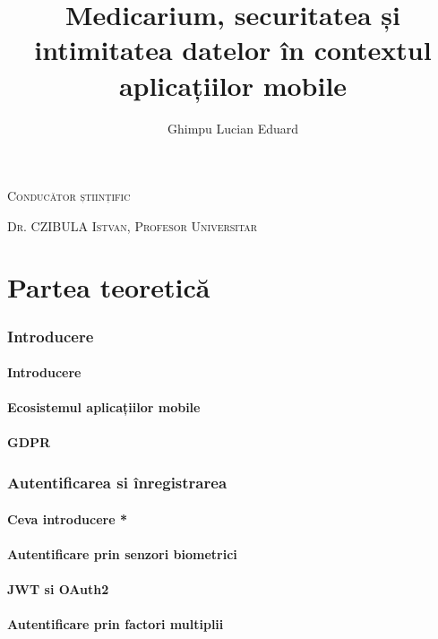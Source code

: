 \documentclass[a4paper]{article}
\begin{document}
\title{Medicarium, securitatea și intimitatea datelor în contextul aplicațiilor mobile}

\author{Ghimpu Lucian Eduard}
\maketitle




\textsc{Conducător științific}

\textsc{Dr. CZIBULA Istvan, Profesor Universitar}

\newpage

\tableofcontents

\part{Partea teoretică}

\section{Introducere}
\subsection{Introducere}
\subsection{Ecosistemul aplicațiilor mobile}
\subsection{GDPR}

\section{Autentificarea si înregistrarea}
\subsection{Ceva introducere *}
\subsection{Autentificare prin senzori biometrici}
\subsection{JWT si OAuth2}
\subsection{Autentificare prin factori multiplii}
\end{document}
